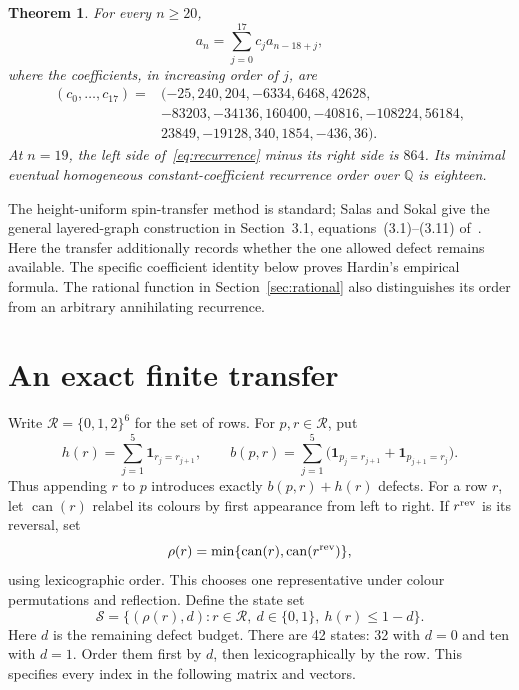 \documentclass[11pt,a4paper]{article}
\newtheorem{theorem}{Theorem}
\newcommand{\Q}{\mathbb Q}
\newcommand{\ind}{\mathbf 1}
\begin{document}
\begin{theorem}\label{thm:recurrence}
For every $n\geq20$,
\begin{equation}\label{eq:recurrence}
 a_n=\sum_{j=0}^{17}c_j a_{n-18+j},
\end{equation}
where the coefficients, in increasing order of $j$, are
\begin{equation}\label{eq:coefficients}
\begin{aligned}
(c_0,\ldots,c_{17})={}&(-25,240,204,-6334,6468,42628,\\
 &-83203,-34136,160400,-40816,-108224,56184,\\
 &23849,-19128,340,1854,-436,36).
\end{aligned}
\end{equation}
At $n=19$, the left side of~\eqref{eq:recurrence} minus its right side is
$864$. Its minimal eventual homogeneous constant-coefficient recurrence
order over $\Q$ is eighteen.
\end{theorem}

The height-uniform spin-transfer method is standard; Salas and Sokal
give the general layered-graph construction in Section~3.1,
equations~(3.1)--(3.11) of~\cite{salas-sokal}. Here the transfer additionally
records whether the one allowed defect remains available. The specific
coefficient identity below proves Hardin's empirical formula. The rational
function in Section~\ref{sec:rational} also distinguishes its order from
an arbitrary annihilating recurrence.

\section{An exact finite transfer}

Write $\mathcal R=\{0,1,2\}^6$ for the set of rows. For $p,r\in\mathcal R$,
put
\[
 h(r)=\sum_{j=1}^5\ind_{r_j=r_{j+1}},\qquad
 b(p,r)=\sum_{j=1}^5
   \bigl(\ind_{p_j=r_{j+1}}+\ind_{p_{j+1}=r_j}\bigr).
\]
Thus appending $r$ to $p$ introduces exactly $b(p,r)+h(r)$ defects.
For a row $r$, let $\operatorname{can}(r)$ relabel its colours by first
appearance from left to right. If $r^{\rm rev}$ is its reversal, set
\[
 \rho(r)=\min\{\operatorname{can}(r),
                       \operatorname{can}(r^{\rm rev})\},
\]
using lexicographic order. This chooses one representative under colour
permutations and reflection. Define the state set
\[
 \mathcal S=\{(\rho(r),d):r\in\mathcal R,\ d\in\{0,1\},\ h(r)\leq1-d\}.
\]
Here $d$ is the remaining defect budget. There are 42 states: 32 with
$d=0$ and ten with $d=1$. Order them first by $d$, then lexicographically
by the row. This specifies every index in the following matrix and vectors.
\end{document}

